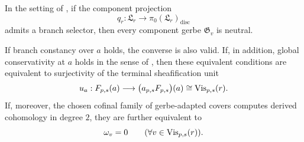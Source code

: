 \begin{theorem}\label{thm:branch-selector-neutrality}
In the setting of , if the component projection
\[
q_r:\mathfrak L_r\to \pi_0(\mathfrak L_r)_{\mathrm{disc}}
\]
admits a branch selector, then every component gerbe $\mathfrak G_v$ is neutral.

If branch constancy over $a$ holds, the converse is also valid. If, in addition, global conservativity at $a$ holds in the sense of , then these equivalent conditions are equivalent to surjectivity of the terminal sheafification unit
\[
u_a:F_{p,s}(a)\longrightarrow \bigl(a_{p,s}F_{p,s}\bigr)(a)\cong \mathrm{Vis}_{p,s}(r).
\]
If, moreover, the chosen cofinal family of gerbe-adapted covers computes derived cohomology in degree $2$, they are further equivalent to
\[
\omega_v=0
\qquad
(\forall v\in \mathrm{Vis}_{p,s}(r)).
\]
\end{theorem}


